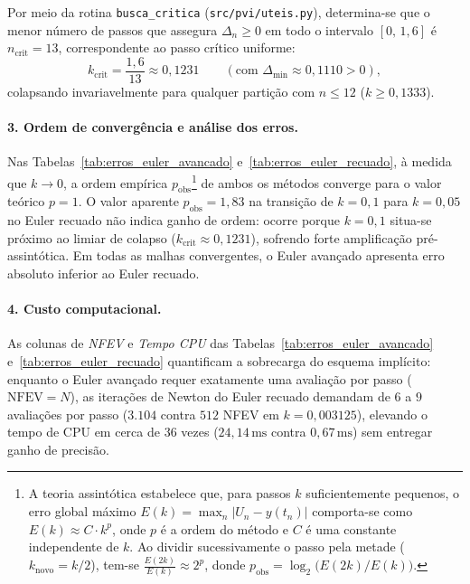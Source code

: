 \documentclass[12pt, a4paper]{article}
\begin{document}
Por meio da rotina \texttt{busca\_critica} (\texttt{src/pvi/uteis.py}), determina-se que o menor número de passos que assegura $\Delta_n \ge 0$ em todo o intervalo $[0,\, 1{,}6]$ é $n_{\text{crit}} = 13$, correspondente ao passo crítico uniforme:
\begin{equation}\label{eq:k-critico-busca}
  k_{\text{crit}} = \frac{1{,}6}{13} \approx 0{,}1231 \qquad (\text{com } \Delta_{\min} \approx 0{,}1110 > 0),
\end{equation}
colapsando invariavelmente para qualquer partição com $n \le 12$ ($k \ge 0{,}1333$).

\paragraph{3. Ordem de convergência e análise dos erros.}
Nas Tabelas~\ref{tab:erros_euler_avancado} e~\ref{tab:erros_euler_recuado}, à medida que $k \to 0$, a ordem empírica $p_{\text{obs}}$\footnote{A teoria assintótica estabelece que, para passos $k$ suficientemente pequenos, o erro global máximo $E(k) = \max_n |U_n - y(t_n)|$ comporta-se como $E(k) \approx C \cdot k^p$, onde $p$ é a ordem do método e $C$ é uma constante independente de $k$. Ao dividir sucessivamente o passo pela metade ($k_{\text{novo}} = k/2$), tem-se $\frac{E(2k)}{E(k)} \approx 2^p$, donde $p_{\text{obs}} = \log_2\bigl(E(2k)/E(k)\bigr)$.} de ambos os métodos converge para o valor teórico $p = 1$. O valor aparente $p_{\text{obs}} = 1{,}83$ na transição de $k = 0{,}1$ para $k = 0{,}05$ no Euler recuado não indica ganho de ordem: ocorre porque $k = 0{,}1$ situa-se próximo ao limiar de colapso ($k_{\text{crit}} \approx 0{,}1231$), sofrendo forte amplificação pré-assintótica. Em todas as malhas convergentes, o Euler avançado apresenta erro absoluto inferior ao Euler recuado.

\paragraph{4. Custo computacional.}
As colunas de \emph{NFEV} e \emph{Tempo CPU} das Tabelas~\ref{tab:erros_euler_avancado} e~\ref{tab:erros_euler_recuado} quantificam a sobrecarga do esquema implícito: enquanto o Euler avançado requer exatamente uma avaliação por passo ($\text{NFEV} = N$), as iterações de Newton do Euler recuado demandam de $6$ a $9$ avaliações por passo ($3.104$ contra $512$ NFEV em $k = 0{,}003125$), elevando o tempo de CPU em cerca de $36$ vezes ($24{,}14\,\text{ms}$ contra $0{,}67\,\text{ms}$) sem entregar ganho de precisão.
\end{document}
